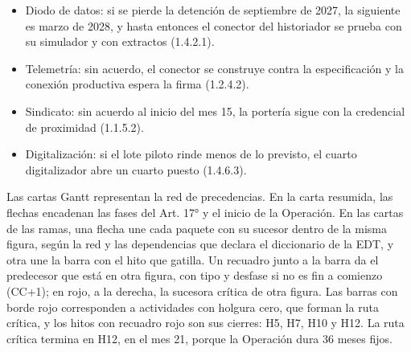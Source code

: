 \documentclass[formulario]{../../comun/overfore}
\begin{document}
\begin{itemize}
\item Diodo de datos: si se pierde la detención de septiembre de 2027, la siguiente es marzo de 2028, y hasta entonces el conector del historiador se prueba con su simulador y con extractos (1.4.2.1).
\item Telemetría: sin acuerdo, el conector se construye contra la especificación y la conexión productiva espera la firma (1.2.4.2).
\item Sindicato: sin acuerdo al inicio del mes 15, la portería sigue con la credencial de proximidad (1.1.5.2).
\item Digitalización: si el lote piloto rinde menos de lo previsto, el cuarto digitalizador abre un cuarto puesto (1.4.6.3).
\end{itemize}
Las cartas Gantt representan la red de precedencias. En la carta resumida, las flechas encadenan las fases del Art. 17° y el inicio de la Operación. En las cartas de las ramas, una flecha une cada paquete con su sucesor dentro de la misma figura, según la red y las dependencias que declara el diccionario de la EDT, y otra une la barra con el hito que gatilla. Un recuadro junto a la barra da el predecesor que está en otra figura, con tipo y desfase si no es fin a comienzo (CC+1); en rojo, a la derecha, la sucesora crítica de otra figura. Las barras con borde rojo corresponden a actividades con holgura cero, que forman la ruta crítica, y los hitos con recuadro rojo son sus cierres: H5, H7, H10 y H12. La ruta crítica termina en H12, en el mes 21, porque la Operación dura 36 meses fijos.
\end{document}
